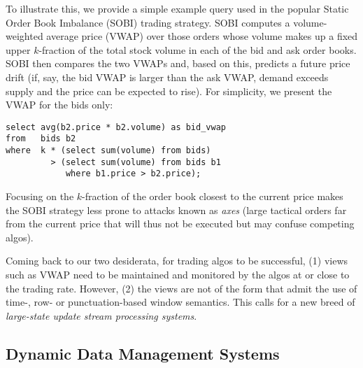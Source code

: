 To illustrate this, we provide a simple example query used in the popular Static
Order Book Imbalance (SOBI) trading strategy. SOBI computes a volume-weighted
average price (VWAP) over those orders whose volume makes up a fixed upper
$k$-fraction of the total stock volume in each of the bid and ask order books. SOBI
then compares the two VWAPs and, based on this, predicts a future price drift (if, say, the bid VWAP is larger than the ask VWAP, demand exceeds supply and the price can be expected to rise). For simplicity, we present the VWAP for the bids only:
\begin{verbatim}
select avg(b2.price * b2.volume) as bid_vwap
from   bids b2
where  k * (select sum(volume) from bids)
         > (select sum(volume) from bids b1
            where b1.price > b2.price);
\end{verbatim}
Focusing on the $k$-fraction of the order book closest to the current price makes the SOBI strategy less prone to attacks known as {\em axes}\/ (large tactical orders far from the current price that will thus not be executed but may confuse competing algos).

Coming back to our two desiderata,
for trading algos to be successful, (1) views such as VWAP need to be maintained and monitored by the algos at or close to the trading rate. However, (2) the views are not of the form that admit the use of time-, row- or punctuation-based
window semantics. This calls for a new breed of {\em large-state update stream processing systems}.


\medskip



\subsection{Dynamic Data Management Systems}


